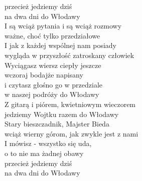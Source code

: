 \begin{flushleft}
przecież jedziemy dziś  \\
na dwa dni do Włodawy  \\
\vskip 3mm
I są wciąż pytania i są wciąż rozmowy  \\
ważne, choć tylko przedziałowe  \\
I jak z każdej wspólnej nam posiady  \\
wygląda w przyszłość zatroskany człowiek  \\
Wyciągasz wiersz ciepły jeszcze  \\
wczoraj bodajże napisany  \\
i czytasz głośno go w przedziale  \\
w naszej podróży do Włodawy  \\
\vskip 3mm
Z gitarą i piórem, kwietniowym wieczorem \\
jedziemy Wojtku razem do Włodawy \\
Stary bieszczadnik, Majster Bieda \\
wciąż wierny górom, jak zwykle jest z nami  \\
I mówisz - wszystko się uda, \\
o to nie ma żadnej obawy \\
przecież jedziemy dziś  \\
na dwa dni do Włodawy\\
\end{flushleft}
\clearpage
